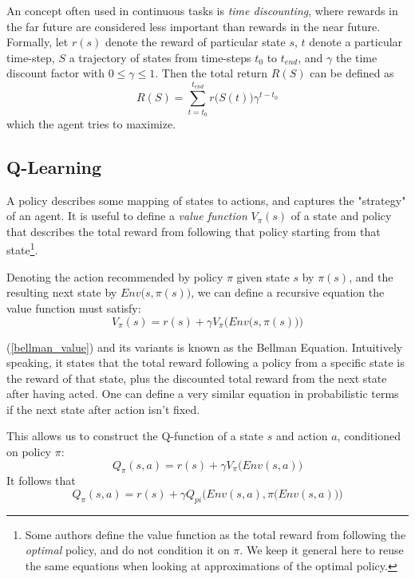 An concept often used in continuous tasks is \textit{time discounting}, where rewards in the far future are considered less important than rewards in the near future. Formally, let $r(s)$ denote the reward of particular state $s$, $t$ denote a particular time-step, $S$ a trajectory of states from time-steps $t_0$ to $t_{end}$, and $\gamma$ the time discount factor with $0 \leq \gamma \leq 1$. Then the total return $R(S)$ can be defined as
\begin{equation}
    R(S) = \sum_{t=t_0}^{t_{end}}{r\big(S(t)\big)\gamma^{t-t_0}}
\end{equation}
which the agent tries to maximize.

\subsection{Q-Learning}
A policy describes some mapping of states to actions, and captures the "strategy" of an agent. It is useful to define a \textit{value function} $V_{\pi}(s)$ of a state and policy that describes the total reward from following that policy starting from that state\footnote{Some authors define the value function as the total reward from following the \textit{optimal} policy, and do not condition it on $\pi$. We keep it general here to reuse the same equations when looking at approximations of the optimal policy.}.

Denoting the action recommended by policy $\pi$ given state $s$ by $\pi(s)$, and the resulting next state by $Env\big(s, \pi(s)\big)$, we can define a recursive equation the value function must satisfy:
\begin{equation}
\label{bellman_value}
    V_{\pi}(s) = r(s) + \gamma V_{\pi} \Big(Env\big(s, \pi(s)\big)\Big)
\end{equation}

(\ref{bellman_value}) and its variants is known as the Bellman Equation. Intuitively speaking, it states that the total reward following a policy from a specific state is the reward of that state, plus the discounted total reward from the next state after having acted. One can define a very similar equation in probabilistic terms if the next state after action isn't fixed.

This allows us to construct the Q-function of a state $s$ and action $a$, conditioned on policy $\pi$:
\begin{equation}
    Q_{\pi}(s, a) = r(s) + \gamma V_{\pi}\big(Env(s, a)\big)
\end{equation}
It follows that
\begin{equation}
    Q_{\pi}(s, a) = r(s) + \gamma Q_{pi}\Big(Env(s, a), \pi\big(Env(s, a)\big)\Big)
\end{equation}

